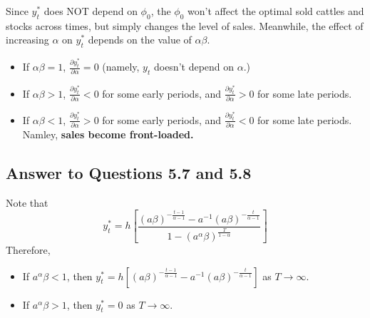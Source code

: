 \documentclass[11pt]{article}
\theoremstyle{definition}
\theoremstyle{boldtitle} %
\numberwithin{equation}{section}
\numberwithin{figure}{section}
\numberwithin{table}{section}
\begin{document}
Since $y_t^*$ does NOT depend on $\phi_0$, the $\phi_0$ won't affect 
the optimal sold cattles and stocks across times, but simply changes the level of sales.
Meanwhile, the effect of increasing $\alpha$ on $y_t^*$ depends on the value of $\alpha \beta$.
\begin{itemize}
    \item If $\alpha \beta = 1$, $\frac{\partial y_t^*}{\partial \alpha} = 0$ (namely, $y_t$ doesn't depend on $\alpha$.)
    \item If $\alpha \beta > 1$, $\frac{\partial y_t^*}{\partial \alpha} < 0$ for some early periods, and $\frac{\partial y_t^*}{\partial \alpha} > 0$ for some late periods.
    \item If $\alpha \beta < 1$, $\frac{\partial y_t^*}{\partial \alpha} > 0$ for some early periods, and $\frac{\partial y_t^*}{\partial \alpha} < 0$ for some late periods.
    Namley, \textbf{sales become front-loaded.}
\end{itemize}

\subsection*{Answer to Questions 5.7 and 5.8}
Note that 
\[
y_t^* =  h \left[ \frac{(a \beta)^{-\frac{t-1}{\alpha - 1}} - a^{-1}(a \beta )^{-\frac{t}{\alpha - 1}} 
    }{
        1 - (a^\alpha \beta)^{\frac{T}{1 - \alpha}}
    }\right]
\]
Therefore, 
\begin{itemize}
    \item If $a^\alpha \beta < 1$, then $y_t^* =  h \left[(a \beta)^{-\frac{t-1}{\alpha - 1}} - a^{-1}(a \beta )^{-\frac{t}{\alpha - 1}} \right]$ as $T \rightarrow \infty$.
    \item If $a^\alpha \beta > 1$, then $y_t^* =  0$ as $T \rightarrow \infty$.
\end{itemize}




\end{document}
